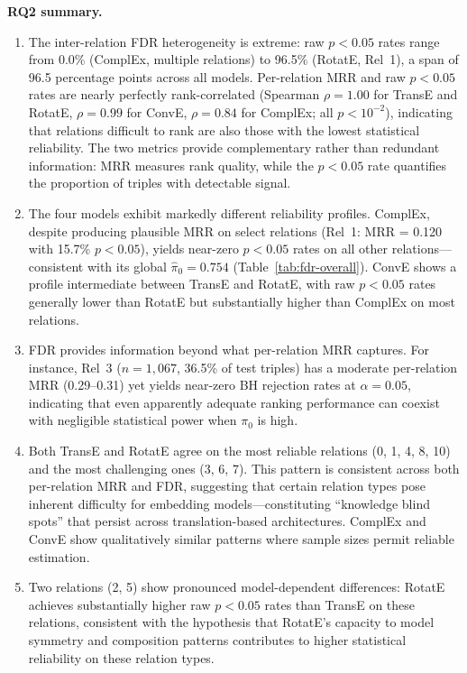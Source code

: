 \textbf{RQ2 summary.}
\begin{enumerate}
    \item The inter-relation FDR heterogeneity is extreme: raw $p < 0.05$ rates range from 0.0\% (ComplEx, multiple relations) to 96.5\% (RotatE, Rel~1), a span of 96.5 percentage points across all models. Per-relation MRR and raw $p < 0.05$ rates are nearly perfectly rank-correlated (Spearman $\rho = 1.00$ for TransE and RotatE, $\rho = 0.99$ for ConvE, $\rho = 0.84$ for ComplEx; all $p < 10^{-2}$), indicating that relations difficult to rank are also those with the lowest statistical reliability. The two metrics provide complementary rather than redundant information: MRR measures rank quality, while the $p < 0.05$ rate quantifies the proportion of triples with detectable signal.
    \item The four models exhibit markedly different reliability profiles. ComplEx, despite producing plausible MRR on select relations (Rel~1: MRR = 0.120 with 15.7\% $p < 0.05$), yields near-zero $p < 0.05$ rates on all other relations---consistent with its global $\hat{\pi}_0 = 0.754$ (Table~\ref{tab:fdr-overall}). ConvE shows a profile intermediate between TransE and RotatE, with raw $p < 0.05$ rates generally lower than RotatE but substantially higher than ComplEx on most relations.
    \item FDR provides information beyond what per-relation MRR captures. For instance, Rel~3 ($n=1{,}067$, 36.5\% of test triples) has a moderate per-relation MRR (0.29--0.31) yet yields near-zero BH rejection rates at $\alpha=0.05$, indicating that even apparently adequate ranking performance can coexist with negligible statistical power when $\pi_0$ is high.
    \item Both TransE and RotatE agree on the most reliable relations (0, 1, 4, 8, 10) and the most challenging ones (3, 6, 7). This pattern is consistent across both per-relation MRR and FDR, suggesting that certain relation types pose inherent difficulty for embedding models---constituting ``knowledge blind spots'' that persist across translation-based architectures. ComplEx and ConvE show qualitatively similar patterns where sample sizes permit reliable estimation.
    \item Two relations (2, 5) show pronounced model-dependent differences: RotatE achieves substantially higher raw $p < 0.05$ rates than TransE on these relations, consistent with the hypothesis that RotatE's capacity to model symmetry and composition patterns contributes to higher statistical reliability on these relation types.
\end{enumerate}

